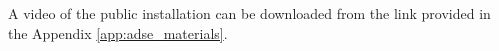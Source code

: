 A video of the public installation can be downloaded from the link provided in the Appendix \ref{app:adse_materials}.



